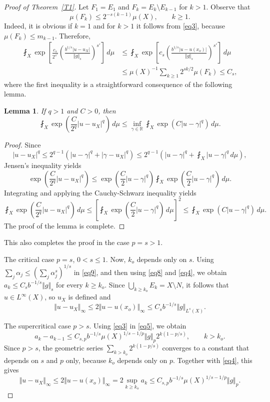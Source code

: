 \documentclass[12pt,leqno]{amsart}
\newtheorem{lemma}[theorem]{Lemma}
\theoremstyle{definition}
\newcommand{\bbbr}{\mathbb R}
\numberwithin{theorem}{section} \numberwithin{equation}{section}
\begin{document}
\begin{proof}[Proof of Theorem~\ref{T1}]
Let $F_{1}=E_{1}$ and $F_k=E_k\setminus E_{k-1}$ for $k>1$. 
Observe that
\[
\mu(F_k)\leq 2^{-s(k-1)}\mu(X),
\qquad
k\geq 1.
\]
Indeed, it is obvious if $k=1$ and for $k>1$ it follows from 
\eqref{eq3}, because $\mu(F_k)\leq m_{k-1}$. Therefore,
\[
\begin{split}
\fint_X\exp\!\left[\frac{c_s}{2^{s'}}\left(\frac{b^{1/s}|u-u_X|}{\Vert g\Vert_s}\right)^{s'}\right]\, d\mu
&\leq
\fint_X\exp\!\left[c_s\left(\frac{b^{1/s}|u-u(x_o)|}{\Vert g\Vert_s}\right)^{s'}\right]\, d\mu\\
&\leq
\mu(X)^{-1}\sum_{k\geq 1} 2^{sk/2}\mu(F_k)\leq C_s,
\end{split}
\]
where the first inequality is a straightforward consequence of the following lemma. 
\begin{lemma}
\label{T6}
If $q>1$ and $C>0$, then
\[
\fint_X\exp\left(\frac{C}{2^q}|u-u_X|^q\right)\, d\mu\leq
\inf_{\gamma\in\bbbr}
\fint_X\exp(C|u-\gamma|^q)\, d\mu.
\]
\end{lemma}
\begin{proof}
Since
\[
|u-u_X|^q\leq 2^{q-1}(|u-\gamma|^q+|\gamma-u_X|^q)\leq
2^{q-1}\left(|u-\gamma|^q+\fint_X|u-\gamma|^q\, d\mu\right),
\]
Jensen's inequality yields
\[
\exp\left(\frac{C}{2^q}|u-u_X|^q\right)\leq 
\exp\left(\frac{C}{2}|u-\gamma|^q\right)
\fint_X\exp\left(\frac{C}{2}|u-\gamma|^q\right)\, d\mu.
\]
Integrating and applying the Cauchy-Schwarz inequality yields
\[
\fint_X
\exp\left(\frac{C}{2^q}|u-u_X|^q\right)\, d\mu\leq
\left[\fint_X\exp\left(\frac{C}{2}|u-\gamma|^q\right)\, d\mu\right]^2
\leq \fint_X \exp(C|u-\gamma|^q)\, d\mu.
\]
The proof of the lemma is complete.
\end{proof}
This also completes the proof in the case $p=s>1$.

\noindent
{\sc The critical case $p=s$, $0<s\leq1$.} 
Now, $k_o$ depends only on $s$. Using
$\sum_j\alpha_j\leq\left(\sum_j\alpha_j^s\right)^{1/s}$
in \eqref{eq9}, and then using \eqref{eq8} and \eqref{eq4}, we obtain
$a_k\leq C_sb^{-1/s}\Vert g\Vert_{s}$ for every $k\geq k_o$.
Since $\bigcup_{k\geq k_o}E_k=X\setminus N$, it follows that $u\in L^\infty(X)$, so $u_X$ is defined and
\[
 \Vert u-u_X\Vert_{\infty}\leq 2\Vert u-u(x_o)\Vert_\infty
 \leq C_sb^{-1/s}\Vert g\Vert_{L^s(X)}.
\]


\noindent
{\sc The supercritical case $p>s$.}
Using \eqref{eq3} in \eqref{eq5}, we obtain
\[
 a_k-a_{k-1}
 \leq C_{s,p}b^{-1/s}\mu(X)^{1/s-1/p}\Vert g\Vert_p
 2^{k(1-p/s)},
 \qquad k>k_o.
\]
Since $p>s$, the geometric series $\sum_{k>k_o}2^{k(1-p/s)}$ converges to a constant that depends on $s$ and $p$ only, because $k_o$ depends only on $p$. Together with \eqref{eq4}, this gives
\[
\Vert u-u_X\Vert_\infty\leq 2\Vert u-u(x_o)\Vert_\infty=
2\sup_{k\geq k_o}a_k
\leq C_{s,p}b^{-1/s}\mu(X)^{1/s-1/p}\Vert g\Vert_p.
\]
\end{proof}
\end{document}
